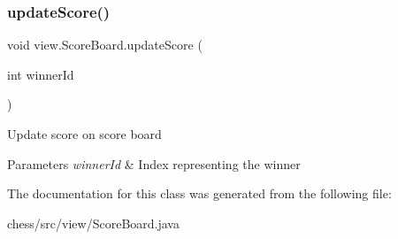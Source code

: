 \subsubsection{\texorpdfstring{updateScore()}{updateScore()}}
{\footnotesize\ttfamily void view.\+Score\+Board.\+update\+Score (\begin{DoxyParamCaption}\item[{int}]{winner\+Id }\end{DoxyParamCaption})\hspace{0.3cm}{\ttfamily [inline]}}

Update score on score board 
\begin{DoxyParams}{Parameters}
{\em winner\+Id} & Index representing the winner \\
\hline
\end{DoxyParams}


The documentation for this class was generated from the following file\+:\begin{DoxyCompactItemize}
\item 
chess/src/view/Score\+Board.\+java\end{DoxyCompactItemize}
